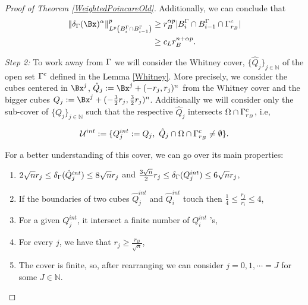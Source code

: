 \begin{proof}[Proof of Theorem \ref{WeightedPoincareOld}]
Additionally, we can conclude that
\begin{align*}
   \|\delta_\GG(\Bx)^\alpha\|^p_{L^p \left(B^\GG_{i}\cap B^\GG_{i-1}\right)}&\geq r_B^{\alpha p} |B^\GG_i\cap B^\GG_{i-1}\cap \GG^c_{r_B}|\\
   &\geq c_L r_B^{n+\alpha p}. 
\end{align*}


\textit{Step 2:} To work away from $\Gamma$ we will consider the Whitney cover, $\{\hat{Q}_j\}_{j\in \mathbb{N}}$ of the open set $\Gamma^c$ defined in the Lemma \ref{Whitney}. More precisely, we consider the  cubes centered in $\Bx^j$, $\hat{Q}_j := \Bx^j + (-r_j,r_j)^n$ from the Whitney cover and the bigger cubes $Q_j := \Bx^j + (-\frac{3}{2}r_j,\frac{3}{2}r_j)^n $. Additionally we will consider only the sub-cover of  $\{Q_j\}_{j\in \mathbb{N}}$ such that the respective $\hat{Q}_j$ intersects $\Omega\cap\Gamma^c_{r_B}$, i.e,

$$\mathcal{U}^{int}:= \{Q_j^{int}:=Q_j,\ \hat{Q}_j\cap\Omega\cap\GG_{r_B}^c\neq \emptyset \}.$$
  
For a better understanding of this cover, we can go over its  main properties:
\begin{enumerate}
    \item $2\sqrt{n} r_j \leq \delta_\Gamma(\hat{Q}^{int}_{j}) \leq 8 \sqrt{n} r_j$ and $\frac{3\sqrt{n}}{2} r_j \leq \delta_\Gamma(Q^{int}_{j}) \leq 6 \sqrt{n} r_j$, 
\item If the boundaries of two cubes $\hat{Q}^{int}_{j}$ and $\hat{Q}^{int}_{i}$ touch then $\frac{1}{4} \leq \frac{r_j}{r_i} \leq 4$,
\item For a given $Q^{int}_{j}$, it intersect a finite number of $Q^{int}_i$ 's,
\item For every $j$, we have that $r_j\geq\frac{r_B}{\sqrt{n}}$,
\item The cover is finite, so, after rearranging we can consider  $j=0,1,\cdots =J$ for some $J\in \mathbb{N}$.
\end{enumerate}



\end{proof}
